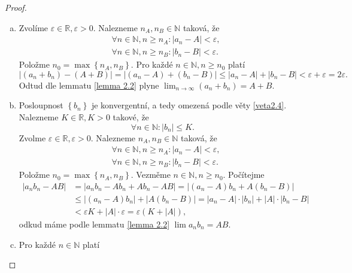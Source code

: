\begin{proof}\,
\begin{enumerate}[(a)]
	\item Zvolíme $\varepsilon \in \mathbb R , \varepsilon > 0$. Nalezneme $n_A, n_B\in \mathbb N $ taková, že
	\begin{equation}\label{dvojrovnice}
	\begin{aligned}
	&\forall n \in \mathbb N , n \geq n_A : |a_n - A| < \varepsilon, \\
	&\forall n \in \mathbb N , n \geq n_B : |b_n - B|<\varepsilon.
\end{aligned}
	\end{equation}
	Položme $n_0 = \max \left \{ n_A, n_B \right \}. $ Pro každé $n \in \mathbb N , n \geq n_0$ platí
	$$
	    |(a_n + b_n) - (A+B)| = |(a_n - A) +(b_n - B)| \leq |a_n - A| + |b_n - B| < \varepsilon + \varepsilon = 2\varepsilon.
	$$
	Odtud dle lemmatu \ref{lemma 2.2} plyne $\lim_{n \to \infty} (a_n + b_n)=A+B$.
	\item Posloupnost $\left \{ b_n \right \} $ je konvergentní, a tedy omezená podle věty \ref{veta2.4}. Nalezneme $K\in \mathbb R , K>0$
	takové, že
	\begin{equation*}
		\forall n \in \mathbb N : |b_n| \leq K.
\end{equation*}
    Zvolme $\varepsilon \in \mathbb R , \varepsilon > 0.$ Nalezneme $n_A, n_B\in \mathbb N $ taková, že
    \begin{equation*}
    \begin{aligned}
    &\forall n \in \mathbb N , n \geq n_A : |a_n - A| < \varepsilon, \\
	&\forall n \in \mathbb N , n \geq n_B : |b_n - B|<\varepsilon.
    \end{aligned}
    \end{equation*}
    Položme $n_0 = \max \left \{ n_A, n_B \right \} $. Vezměme $n\in \mathbb N , n \geq n_0$. Počítejme
    \begin{align*}
        |a_nb_n-AB|& = |a_nb_n-Ab_n+Ab_n-AB| = |(a_n-A)b_n + A(b_n-B)|\\
        &\leq |(a_n-A)b_n| + |A(b_n-B)| = |a_n-A| \cdot |b_n| + |A| \cdot |b_n-B| \\
        &< \varepsilon K + |A|\cdot \varepsilon = \varepsilon ( K+|A|),
    \end{align*}
    odkud máme podle lemmatu \ref{lemma 2.2} $\lim a_nb_n = AB$.
    \item Pro každé $n\in \mathbb N $ platí
    \begin{equation}\label{velkarovnice}

\end{equation}
\end{enumerate}
\end{proof}
